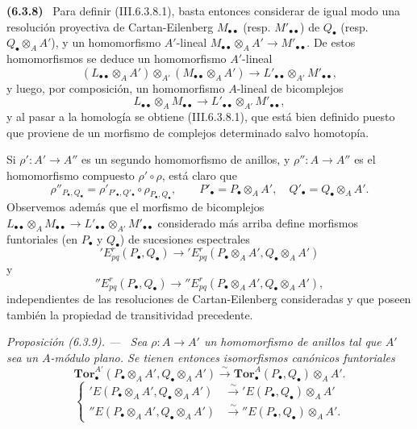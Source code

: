 \documentclass[10pt,oneside]{book}
\newcommand{\sref}[2][]{\textup{(#2)}}
\newenvironment{env}[1][]{\par\medskip\noindent\textbf{(#1)}\ }{\par}
\newenvironment{proposition}[1][]{\par\medskip\noindent\itshape Proposición (#1). ---\ }{\par}
\begin{document}
\begin{env}[6.3.8]
Para definir \sref{III.6.3.8.1}, basta entonces considerar de igual modo una
resolución proyectiva de Cartan-Eilenberg $M_{\bullet\bullet}$ (resp.
$M'_{\bullet\bullet}$) de $Q_\bullet$ (resp.
$Q_\bullet\otimes_A A'$), y un homomorfismo $A'$-lineal
$M_{\bullet\bullet}\otimes_A A'\to M'_{\bullet\bullet}$. De estos
homomorfismos se deduce un homomorfismo $A'$-lineal
\[
  (L_{\bullet\bullet}\otimes_A A')\otimes_{A'}
  (M_{\bullet\bullet}\otimes_A A')
  \longrightarrow
  L'_{\bullet\bullet}\otimes_{A'}M'_{\bullet\bullet},
\]
y luego, por composición, un homomorfismo $A$-lineal de bicomplejos
\[
  L_{\bullet\bullet}\otimes_A M_{\bullet\bullet}
  \longrightarrow
  L'_{\bullet\bullet}\otimes_{A'}M'_{\bullet\bullet},
\]
y al pasar a la homología se obtiene \sref{III.6.3.8.1}, que está bien
definido
puesto que proviene de un morfismo de complejos determinado salvo homotopía.

Si $\rho':A'\to A''$ es un segundo homomorfismo de anillos, y
$\rho'':A\to A''$ es el homomorfismo compuesto $\rho'\circ\rho$, está claro
que
\[
  \rho''_{P_\bullet,Q_\bullet}
  =\rho'_{P'_\bullet,Q'_\bullet}\circ\rho_{P_\bullet,Q_\bullet},
  \qquad
  P'_\bullet=P_\bullet\otimes_A A',
  \quad Q'_\bullet=Q_\bullet\otimes_A A'.
\]
Observemos además que el morfismo de bicomplejos
$L_{\bullet\bullet}\otimes_A M_{\bullet\bullet}
\to L'_{\bullet\bullet}\otimes_{A'}M'_{\bullet\bullet}$ considerado
más arriba define morfismos funtoriales (en $P_\bullet$ y $Q_\bullet$) de
sucesiones espectrales
\[
  'E_{pq}^r(P_\bullet,Q_\bullet)
  \longrightarrow
  'E_{pq}^r(P_\bullet\otimes_A A',Q_\bullet\otimes_A A')
\]
y
\[
  ''E_{pq}^r(P_\bullet,Q_\bullet)
  \longrightarrow
  ''E_{pq}^r(P_\bullet\otimes_A A',Q_\bullet\otimes_A A'),
\]
independientes de las resoluciones de Cartan-Eilenberg consideradas y que
poseen también la propiedad de transitividad precedente.
\end{env}

\begin{proposition}[6.3.9]
\label{III.6.3.9}
Sea $\rho:A\to A'$ un homomorfismo de anillos tal que $A'$ sea un
$A$-módulo \textup{plano}. Se tienen entonces isomorfismos canónicos funtoriales
\[
  \mathbf{Tor}_\bullet^{A'}
  (P_\bullet\otimes_A A',Q_\bullet\otimes_A A')
  \xrightarrow{\sim}
  \mathbf{Tor}_\bullet^A(P_\bullet,Q_\bullet)\otimes_A A'.
  \tag{6.3.9.1}\label{III.6.3.9.1}
\]
\[
  \left\{
  \begin{aligned}
  'E(P_\bullet\otimes_A A',Q_\bullet\otimes_A A')
    &\xrightarrow{\sim}'E(P_\bullet,Q_\bullet)\otimes_A A'\\
  ''E(P_\bullet\otimes_A A',Q_\bullet\otimes_A A')
    &\xrightarrow{\sim}''E(P_\bullet,Q_\bullet)\otimes_A A'.
  \end{aligned}
  \right.
  \tag{6.3.9.2}\label{III.6.3.9.2}
\]
\end{proposition}
\end{document}
